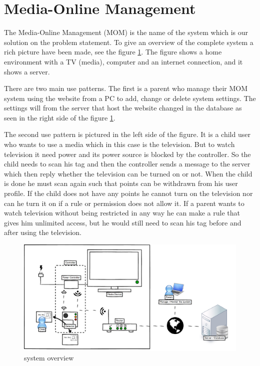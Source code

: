\section{Media-Online Management} %
The Media-Online Management (MOM) is the name of the system which is our solution on the problem statement. To give an overview of the complete system a rich picture \citep{OOAD} have been made, see the figure \ref{fig:systemoverview}. The figure shows a home environment with a TV (media), computer and an internet connection, and it shows a server. 

There are two main use patterns. The first is a parent who manage their MOM system using the website from a PC to add, change or delete system settings. The settings will from the server that host the website changed in the database as seen in the right side of the figure \ref{fig:systemoverview}. 

The second use pattern is pictured in the left side of the figure. It is a child user who wants to use a media which in this case is the television. But to watch television it need power and its power source is blocked by the controller. So the child needs to scan his tag and then the controller sends a message to the server which then reply whether the television can be turned on or not. When the child is done he must scan again such that points can be withdrawn from his user profile. If the child does not have any points he cannot turn on the television nor can he turn it on if a rule or permission does not allow it. If a parent wants to watch television without being restricted in any way he can make a rule that gives him unlimited access, but he would still need to scan his tag before and after using the television. 

\begin{figure}
	\centering
		\includegraphics[width=1.00\textwidth, angle= 90]{images/systemoverview2.png}
	\caption{system overview}
	\label{fig:systemoverview}
\end{figure}

